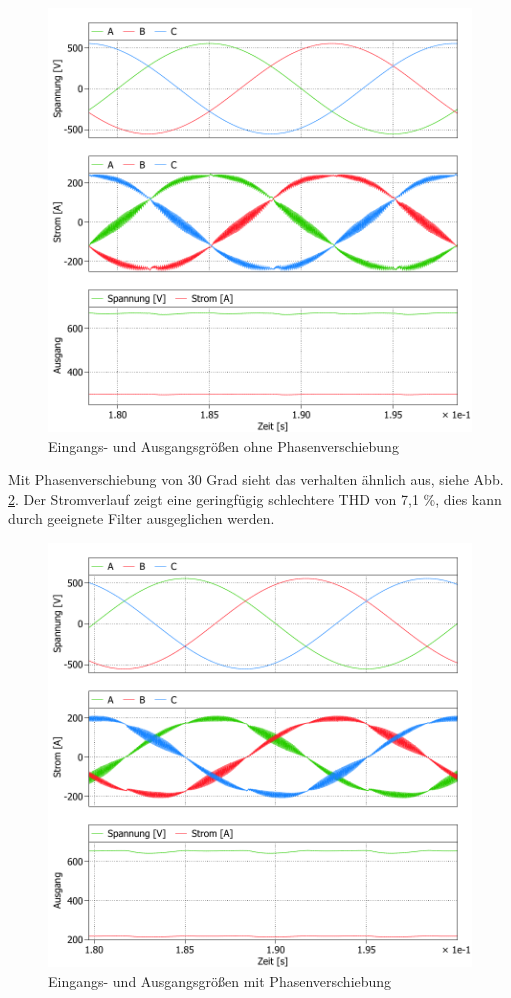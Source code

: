 	\begin{figure}[H]
		\centering
		\includegraphics[width=0.9\linewidth]{content/Grafiken/B6_AC+DC_0Grad}
		\caption{Eingangs- und Ausgangsgrößen ohne Phasenverschiebung}
		\label{fig:b6acdc0grad}
	\end{figure}
	Mit Phasenverschiebung von 30 Grad sieht das verhalten ähnlich aus, siehe Abb. \ref{fig:b6acdc30grad}. Der Stromverlauf zeigt eine geringfügig schlechtere THD von 7,1 \%, dies kann durch geeignete Filter ausgeglichen werden. 
\begin{figure}
	\centering
	\includegraphics[width=0.7\linewidth]{content/Grafiken/B6_AC+DC_30Grad}
	\caption{Eingangs- und Ausgangsgrößen mit Phasenverschiebung}
	\label{fig:b6acdc30grad}
\end{figure}

